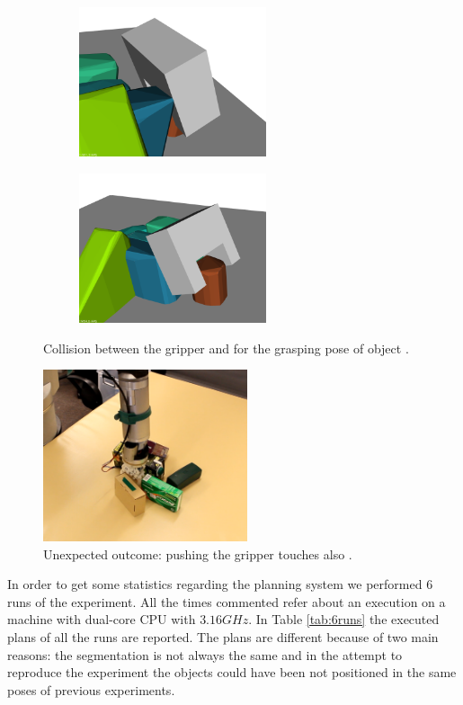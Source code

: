 \begin{figure}
\centering
\begin{subfigure}[t]{0.45\textwidth}
\centering
\includegraphics[width = 5.5cm]{Img/experiments/exp_good/grasp_o2.png}
\caption{}
\end{subfigure}
\begin{subfigure}[t]{0.45\textwidth}
\centering
\includegraphics[width = 5.5cm]{Img/experiments/exp_good/grasp_o2_2.png}
\caption{}
\end{subfigure}
\caption{Collision between the gripper and  for the grasping pose of object .}\label{fig:exp_good_grasp_o2}
\end{figure}

\begin{figure}[tb]
\centering
\includegraphics[width=6cm]{Img/experiments/exp_good/pushing_o0c.png}
\caption{Unexpected outcome: pushing  the gripper touches also .}\label{fig:pushing_o0}
\end{figure}

In order to get some statistics regarding the planning system we performed 6 runs of the experiment. All the times commented refer about an execution on a machine with dual-core CPU with $3.16GHz$. In Table \ref{tab:6runs} the executed plans of all the runs are reported. The plans are different because of two main reasons: the segmentation is not always the same and in the attempt to reproduce the experiment the objects could have been not positioned in the same poses of previous experiments. 

